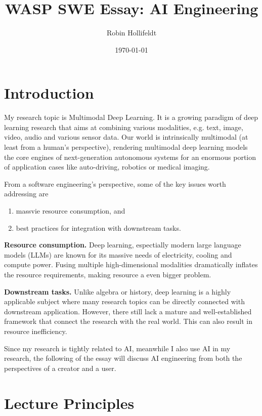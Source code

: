 \documentclass[11pt,a4paper]{article}
\title{WASP SWE Essay: AI Engineering}
\author{Robin Hollifeldt}
\date{\today}
\begin{document}
\maketitle



\section{Introduction}

My research topic is Multimodal Deep Learning. It is a growing paradigm of deep learning research that aims at combining various modalities, e.g. text, image, video, audio and various sensor data. Our world is intrinsically multimodal (at least from a human's perspective), rendering multimodal deep learning models the core engines of next-generation autonomous systems for an enormous portion of application cases like auto-driving, robotics or medical imaging.

From a software engineering's perspective, some of the key issues worth addressing are 
\begin{enumerate}
    \item massvie resource consumption, and
    \item best practices for integration with downstream tasks.
    
\end{enumerate}

\textbf{Resource consumption.} Deep learning, espectially modern large language models (LLMs) are known for its massive needs of electricity, cooling and compute power. Fusing multiple high-dimensional modalities dramatically inflates the resource requirements, making resource a even bigger problem.

\textbf{Downstream tasks.} Unlike algebra or history, deep learning is a highly applicable subject where many research topics can be directly connected with downstream application. However, there still lack a mature and well-established framework that connect the research with the real world. This can also result in resource inefficiency.

Since my research is tightly related to AI, meanwhile I also use AI in my research, the following of the essay will discuss AI engineering from both the perspectives of a creator and a user.



\section{Lecture Principles}
\end{document}
